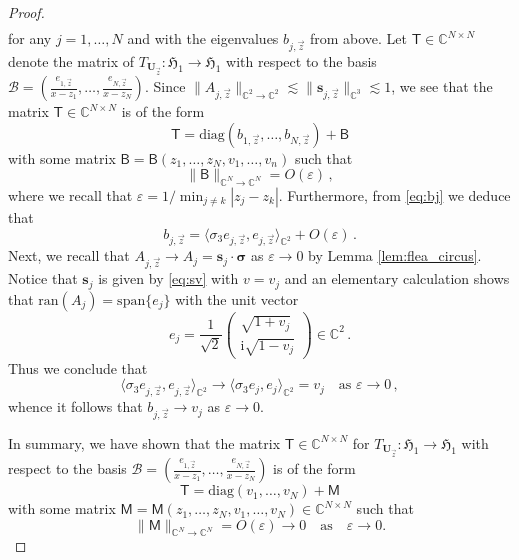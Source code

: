 \documentclass[11pt,reqno]{amsart}
\theoremstyle{definition}
\theoremstyle{remark}
\theoremstyle{remark}
\numberwithin{equation}{section}
\newcommand{\Hfr}{\mathfrak{H}}
\newcommand{\C}{\mathbb{C}}
\newcommand{\ran}{\mathrm{ran}}
\newcommand{\sv}{\mathbf{s}}
\newcommand{\eps}{\varepsilon}
\newcommand{\ii}{\mathrm{i}}
\newcommand{\Ub}{\mathbf{U}}
\begin{document}
\begin{appendix}
\begin{proof}
\begin{align*}
\end{align*}
for any $j=1, \ldots, N$ and with the eigenvalues $b_{j,\vec{z}}$ from above. Let $\mathsf{T} \in \C^{N \times N}$ denote the matrix of $T_{\Ub_{\vec{z}}} : \Hfr_1 \to \Hfr_1$ with respect to the basis $\mathcal{B} = \left ( \frac{e_{1,\vec{z}}}{x-z_1}, \ldots, \frac{e_{N,\vec{z}}}{x-z_N} \right )$. Since $\| A_{j,\vec{z}} \|_{\C^2 \to \C^2} \lesssim \|\sv_{j,\vec{z}}\|_{\C^3} \lesssim 1$, we see that the matrix $\mathsf{T} \in \C^{N \times N}$ is of the form
$$
\mathsf{T} = \mathrm{diag}(b_{1,\vec{z}}, \ldots, b_{N,\vec{z}}) + \mathsf{B}
$$
with some matrix  $\mathsf{B}=\mathsf{B}(z_1, \ldots, z_N, v_1, \ldots, v_n)$ such that
$$
\| \mathsf{B} \|_{\C^N \to \C^N} = O(\eps) \, ,
$$
where we recall that $\eps = 1/\min_{j \neq k} |z_j - z_k|$. Furthermore, from \eqref{eq:bj} we deduce that
$$
b_{j,\vec{z}} = \langle \sigma_3 e_{j,\vec{z}}, e_{j,\vec{z}} \rangle_{\C^2} + O(\eps) \, .
$$
Next, we recall that $A_{j,\vec{z}} \to A_j = \sv_j \cdot \bm{\sigma}$ as $\eps \to 0$ by Lemma \ref{lem:flea_circus}. Notice that $\sv_j$ is given by \eqref{eq:sv} with $v=v_j$ and an elementary calculation shows that $\ran(A_j) = \mathrm{span} \{ e_j \}$ with the unit vector
$$
e_j=\frac{1}{\sqrt{2}} \left ( \begin{array}{c} \sqrt{1+v_j} \\ \ii \sqrt{1-v_j} \end{array} \right ) \in \C^2 \, .
$$
 Thus we conclude that
$$
\langle \sigma_3 e_{j,\vec{z}}, e_{j, \vec{z}} \rangle_{\C^2} \to  \langle \sigma_3 e_j, e_j \rangle_{\C^2} = v_j \quad \mbox{as $\eps \to 0$} \, ,
$$
whence it follows that $b_{j,\vec{z}} \to v_j$ as $\eps \to 0$. 

In summary, we have shown that the matrix $\mathsf{T} \in \C^{N \times N}$ for $T_{\Ub_{\vec{z}}} : \Hfr_1 \to \Hfr_1$ with respect to the basis $\mathcal{B} = \left ( \frac{e_{1,\vec{z}}}{x-z_1}, \ldots, \frac{e_{N,\vec{z}}}{x-z_N} \right )$ is of the form
$$
\mathsf{T} = \mathrm{diag}(v_1, \ldots, v_N) + \mathsf{M}
$$
with some matrix $\mathsf{M}=\mathsf{M}(z_1, \ldots, z_N, v_1, \ldots, v_N) \in \C^{N \times N}$ such that 
$$
\| \mathsf{M} \|_{\C^N \to \C^N} = O(\eps) \to 0 \quad \mbox{as} \quad \eps \to 0.
$$ 


\end{proof}
\end{appendix}
\end{document}
